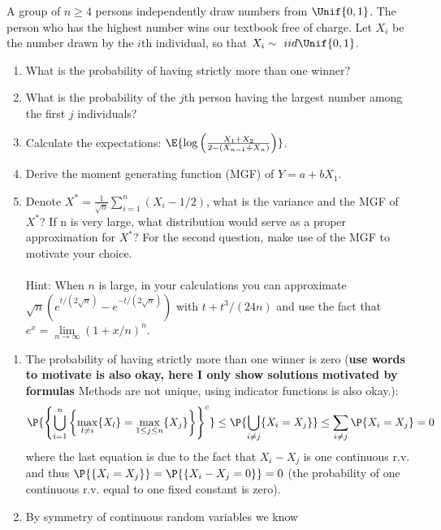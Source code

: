  \begin{exercise}
 	 A group of $n\geq 4$ persons independently draw numbers from $\Unif{0,1}$. The person who has the highest number wins our textbook free of charge. Let $X_i$ be the number drawn by the $i$th individual, so that $X_i\sim \ iid\Unif{0,1}$. 
 	 \begin{enumerate}
 	 	\item What is the probability of having strictly more than one winner? 
 	 	\item What is the probability of the $j$th person having the largest number among the first $j$ individuals?	
 	 	\item Calculate the expectations:  $\E{\log\left(\frac{X_1+X_2}{2-(X_{n-1}+X_n)} \right)}$. 
 	 	\item Derive the moment generating function (MGF) of $Y=a+b X_1$. 
 	 	\item Denote ${X}^*= \frac{1}{\sqrt{n}}\sum_{i=1}^{n}\left(X_i-1/2\right)$, what is the variance and the MGF of $X^*$? If n is very large, what distribution would serve as a proper approximation for $X^*$? For the second question, make use of the MGF to motivate your choice. \\\\
 	 	Hint: When $n$ is large, in your calculations you can approximate $\sqrt{n} \left(e^{t/(2\sqrt{n})} -e^{-t/(2\sqrt{n})}\right)$ with $t+t^3/(24n)$  and use the fact that $e^x=\lim\limits_{n\rightarrow \infty}(1+x/n)^n$.
 	 \end{enumerate}
  \begin{solution}
  	\begin{enumerate}
  		\item 		 The probability of having strictly more than one winner is zero (\textbf{use words to motivate is also okay, here I only show solutions motivated by formulas} Methods are not unique, using indicator functions is also okay.):
  		\begin{align*}
  			\P{\left\{ \bigcup_{i=1}^n \left\{ \max_{l\neq i} \{X_l\} =\max_{1\leq j \leq n} \{X_j\} \right\}    \right\}^c} \leq \P{ \bigcup_{i\neq j} \{ X_i =X_j \}} \leq \sum_{i\neq j} \P{ X_i =X_j }=0
  		\end{align*}	
  		where the last equation is due to the fact that $X_i-X_j$ is one continuous r.v. and thus $\P{ \{ X_i =X_j \}} = \P{ \{ X_i-X_j =0\} }=0$ (the probability of one continuous r.v. equal to one fixed constant is zero).
  		\item			By symmetry of continuous random variables we know 

\end{enumerate}
\end{solution}
\end{exercise}
